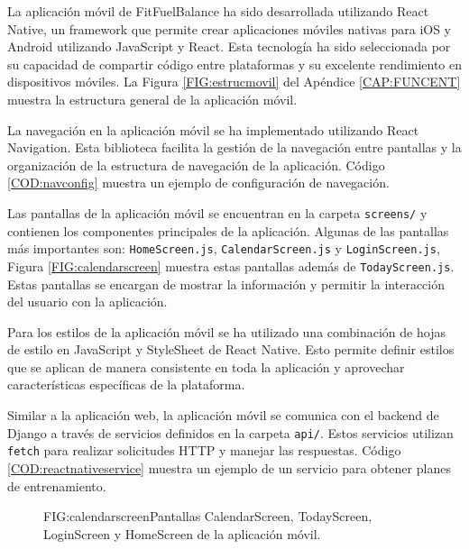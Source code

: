 La aplicación móvil  de FitFuelBalance ha sido desarrollada utilizando React Native, un framework que permite crear aplicaciones móviles nativas para iOS y Android utilizando JavaScript y React. Esta tecnología ha sido seleccionada por su capacidad de compartir código entre plataformas y su excelente rendimiento en dispositivos móviles. La Figura \ref{FIG:estrucmovil} del Apéndice \ref{CAP:FUNCENT} muestra la estructura general de la aplicación móvil.

La navegación  en la aplicación móvil se ha implementado utilizando React Navigation. Esta biblioteca facilita la gestión de la navegación entre pantallas y la organización de la estructura de navegación de la aplicación. Código \ref{COD:navconfig} muestra un ejemplo de configuración de navegación.

Las pantallas de la aplicación móvil se encuentran en la carpeta \texttt{screens/}  y contienen los componentes principales de la aplicación. Algunas de las pantallas más importantes son: \texttt{HomeScreen.js}, \texttt{CalendarScreen.js} y \texttt{LoginScreen.js}, Figura \ref{FIG:calendarscreen} muestra estas pantallas además de \texttt{TodayScreen.js}. Estas pantallas se encargan de mostrar la información y permitir la interacción del usuario con la aplicación.

Para los estilos  de la aplicación móvil se ha utilizado una combinación de hojas de estilo en JavaScript y StyleSheet de React Native. Esto permite definir estilos que se aplican de manera consistente en toda la aplicación y aprovechar características específicas de la plataforma.

Similar a la aplicación web, la aplicación móvil se comunica con el backend de Django a través de servicios definidos en la carpeta \texttt{api/}. Estos servicios utilizan \texttt{fetch}  para realizar solicitudes HTTP y manejar las respuestas. Código \ref{COD:reactnativeservice} muestra un ejemplo de un servicio para obtener planes de entrenamiento.

\begin{figure}[CalendarScreen, TodayScreen, LoginScreen y HomeScreen]{FIG:calendarscreen}{Pantallas CalendarScreen, TodayScreen, LoginScreen y HomeScreen de la aplicación móvil.}
\end{figure}

\newpage